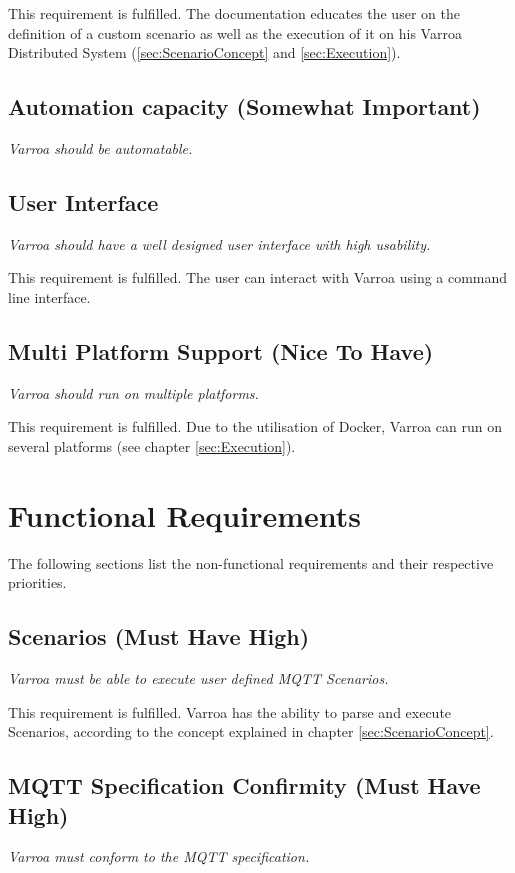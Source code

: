 This requirement is fulfilled.
The documentation educates the user on the definition of a custom scenario as well as the execution of it on his Varroa Distributed System (\ref{sec:ScenarioConcept} and \ref{sec:Execution}).

\subsection{Automation capacity (Somewhat Important)} 
\emph{Varroa should be automatable.}


\subsection{User Interface}
\emph{Varroa should have a well designed user interface with high usability.}

This requirement is fulfilled.
The user can interact with Varroa using a command line interface.

\subsection{Multi Platform Support (Nice To Have)}
\emph{Varroa should run on multiple platforms.}

This requirement is fulfilled.
Due to the utilisation of Docker, Varroa can run on several platforms (see chapter \ref{sec:Execution}).

\section{Functional Requirements}
The following sections list the non-functional requirements and their respective priorities.

\subsection{Scenarios (Must Have High)}
\emph{Varroa must be able to execute user defined MQTT Scenarios.}

This requirement is fulfilled.
Varroa has the ability to parse and execute Scenarios, according to the concept explained in chapter \ref{sec:ScenarioConcept}.

\subsection{MQTT Specification Confirmity (Must Have High)}
\emph{Varroa must conform to the MQTT specification.}

